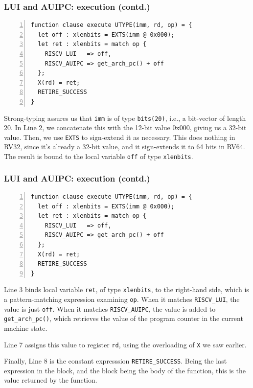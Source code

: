 \documentclass[aspectratio=169]{beamer}
\newcommand{\slidefont}{\scriptsize}
\newcommand{\cf}{\scriptsize\tt}
\begin{document}

\begin{frame}[fragile]
  \frametitle{LUI and AUIPC: execution (contd.)}

  \slidefont

  \begin{Verbatim}[frame=single, numbers=left, label = File riscv\_insts\_base.sail]
function clause execute UTYPE(imm, rd, op) = {
  let off : xlenbits = EXTS(imm @ 0x000);
  let ret : xlenbits = match op {
    RISCV_LUI   => off,
    RISCV_AUIPC => get_arch_pc() + off
  };
  X(rd) = ret;
  RETIRE_SUCCESS
}
  \end{Verbatim}

  \begin{minipage}{\textwidth}
    Strong-typing assures us that {\cf imm} is of type {\cf bits(20)},
    i.e., a bit-vector of length 20.  In Line 2, we concatenate this
    with the 12-bit value 0x000, giving us a 32-bit value.  Then, we
    use {\cf EXTS} to sign-extend it as necessary. This does nothing
    in RV32, since it's already a 32-bit value, and it sign-extends it
    to 64 bits in RV64.  The result is bound to the local variable
    {\cf off} of type {\cf xlenbits}.
  \end{minipage}

\end{frame}


\begin{frame}[fragile]
  \frametitle{LUI and AUIPC: execution (contd.)}

  \slidefont

  \begin{Verbatim}[frame=single, numbers=left, label = File riscv\_insts\_base.sail]
function clause execute UTYPE(imm, rd, op) = {
  let off : xlenbits = EXTS(imm @ 0x000);
  let ret : xlenbits = match op {
    RISCV_LUI   => off,
    RISCV_AUIPC => get_arch_pc() + off
  };
  X(rd) = ret;
  RETIRE_SUCCESS
}
  \end{Verbatim}

  \begin{minipage}{\textwidth}
    Line 3 binds local variable {\cf ret}, of type {\cf xlenbits}, to
    the right-hand side, which is a pattern-matching expression
    examining {\cf op}.  When it matches {\cf RISCV\_LUI}, the value
    is just {\cf off}.  When it matches {\cf RISCV\_AUIPC}, the value
    is added to {\cf get\_arch\_pc()}, which retrieves the value of
    the program counter in the current machine state.

    \vspace{1ex}

    Line 7 assigns this value to register {\cf rd}, using the overloading of {\cf X} we saw earlier.

    \vspace{1ex}

    Finally, Line 8 is the constant expresssion {\cf RETIRE\_SUCCESS}.
    Being the last expression in the block, and the block being the
    body of the function, this is the value returned by the function.
  \end{minipage}

\end{frame}
\end{document}
